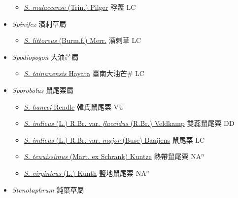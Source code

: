 \begin{itemize}
  \begin{itemize}
        \item[] \href{http://www.theplantlist.org/tpl1.1/search?q=Sphaerocaryum+malaccense}{\textit{S. malaccense} (Trin.) Pilger}   稃藎 LC
  \end{itemize}
 \item[] \textit{Spinifex} 濱刺草屬
                    
  \begin{itemize}
        \item[] \href{http://www.theplantlist.org/tpl1.1/search?q=Spinifex+littoreus}{\textit{S. littoreus} (Burm.f.) Merr.}   濱刺草 LC
  \end{itemize}
 \item[] \textit{Spodiopogon} 大油芒屬
                    
  \begin{itemize}
        \item[] \href{http://www.theplantlist.org/tpl1.1/search?q=Spodiopogon+tainanensis}{\textit{S. tainanensis} Hayata}   臺南大油芒\# LC
  \end{itemize}
 \item[] \textit{Sporobolus} 鼠尾粟屬
                    
  \begin{itemize}
        \item[] \href{http://www.theplantlist.org/tpl1.1/search?q=Sporobolus+hancei}{\textit{S. hancei} Rendle}   韓氏鼠尾粟 VU
        \item[] \href{http://www.theplantlist.org/tpl1.1/search?q=Sporobolus+indicus+var.+flaccidus}{\textit{S. indicus} (L.) R.Br. var. \textit{flaccidus} (R.Br.) Veldkamp}   雙蕊鼠尾粟 DD
        \item[] \href{http://www.theplantlist.org/tpl1.1/search?q=Sporobolus+indicus+var.+major}{\textit{S. indicus} (L.) R.Br. var. \textit{major} (Buse) Baaijens}   鼠尾粟 LC
        \item[] \href{http://www.theplantlist.org/tpl1.1/search?q=Sporobolus+tenuissimus}{\textit{S. tenuissimus} (Mart. ex Schrank) Kuntze}   熱帶鼠尾粟 NA$^n$
        \item[] \href{http://www.theplantlist.org/tpl1.1/search?q=Sporobolus+virginicus}{\textit{S. virginicus} (L.) Kunth}   鹽地鼠尾粟 NA$^n$
  \end{itemize}
 \item[] \textit{Stenotaphrum} 鈍葉草屬
                    

\end{itemize}
